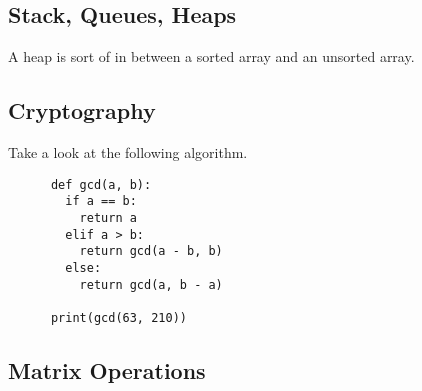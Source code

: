   \begin{definition}

  \end{definition}

  \begin{definition}
    
  \end{definition}

\subsection{Stack, Queues, Heaps}

  A heap is sort of in between a sorted array and an unsorted array. 

\subsection{Cryptography} 

  \begin{example}
    Take a look at the following algorithm. 
    \begin{lstlisting}
      def gcd(a, b): 
        if a == b: 
          return a
        elif a > b: 
          return gcd(a - b, b) 
        else: 
          return gcd(a, b - a)

      print(gcd(63, 210))
    \end{lstlisting}
  \end{example}

  \begin{definition}
    
  \end{definition}

  \begin{definition}
    
  \end{definition}

\subsection{Matrix Operations}

  \begin{definition}
    
  \end{definition}

  \begin{definition}
    
  \end{definition}

  \begin{definition}[QR Decomposition]
    
  \end{definition}

  \begin{definition}[LU Decomposition]
    
  \end{definition}

  \begin{definition}
    
  \end{definition}


